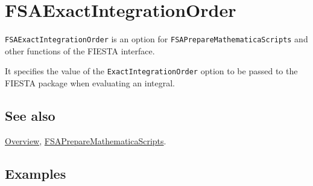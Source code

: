 \documentclass[../FeynHelpersManual.tex]{subfiles}
\begin{document}
\hypertarget{fsaexactintegrationorder}{
\section{FSAExactIntegrationOrder}\label{fsaexactintegrationorder}}

\texttt{FSAExactIntegrationOrder} is an option for
\texttt{FSAPrepareMathematicaScripts} and other functions of the FIESTA
interface.

It specifies the value of the \texttt{ExactIntegrationOrder} option to
be passed to the FIESTA package when evaluating an integral.

\subsection{See also}

\hyperlink{toc}{Overview},
\hyperlink{fsapreparemathematicascripts}{FSAPrepareMathematicaScripts}.

\subsection{Examples}
\end{document}
